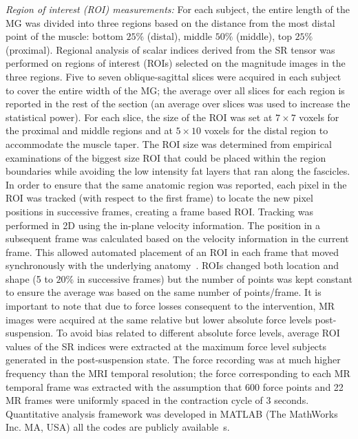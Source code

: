 \textit{Region of interest (ROI) measurements:}
For each subject, the entire length of the MG was divided into three regions based on the distance from the most distal point of the muscle: bottom $25\%$ (distal), middle $50\%$ (middle), top $25\%$ (proximal).
Regional analysis of scalar indices derived from the SR tensor was performed on regions of interest (ROIs) selected on the magnitude images in the three regions.
Five to seven oblique-sagittal slices were acquired in each subject to cover the entire width of the MG; the average over all slices for each region is reported in the rest of the section (an average over slices was used to increase the statistical power). 
For each slice, the size of the ROI was set at $7 \times 7$ voxels for the proximal and middle regions and at $5 \times 10$ voxels for the distal region to accommodate the muscle taper.
The ROI size was determined from empirical examinations of the biggest size ROI that could be placed within the region boundaries while avoiding the low intensity fat layers that ran along the fascicles.
In order to ensure that the same anatomic region was reported, each pixel in the ROI was tracked (with respect to the first frame) to locate the new pixel positions in successive frames, creating a frame based ROI. 
Tracking was performed in 2D using the in-plane velocity information. 
The position in a subsequent frame was calculated based on the velocity information in the current frame. 
This allowed automated placement of an ROI in each frame that moved synchronously with the underlying anatomy~\cite{RNS16}.
ROIs changed both location and shape (5 to $20\%$ in successive frames) but the number of points was kept constant to ensure the average was based on the same number of points/frame. 
It is important to note that due to force losses consequent to the intervention, MR images were acquired at the same relative but lower absolute force levels post-suspension. 
To avoid bias related to different absolute force levels, average ROI values of the SR indices were extracted at the maximum force level subjects generated in the post-suspension state. 
The force recording was at much higher frequency than the MRI temporal resolution; the force corresponding to each MR temporal frame was extracted with the assumption that 600 force points and 22 MR frames were uniformly spaced in the contraction cycle of 3 seconds. Quantitative analysis framework was developed in MATLAB (The MathWorks Inc. MA, USA) all the codes are publicly available~\cite{2DSR}s.

